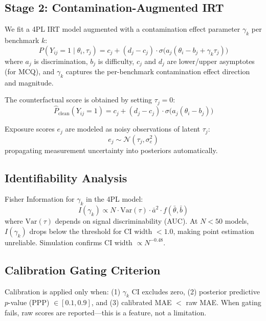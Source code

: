 \documentclass[11pt,a4paper]{article}
\begin{document}
\subsection{Stage 2: Contamination-Augmented IRT}

We fit a 4PL IRT model augmented with a contamination effect parameter $\gamma_k$ per benchmark $k$:
\begin{equation}
P(Y_{ij} = 1 \mid \theta_i, \tau_j) = c_j + (d_j - c_j) \cdot \sigma\bigl(a_j(\theta_i - b_j + \gamma_k \tau_j)\bigr)
\end{equation}
where $a_j$ is discrimination, $b_j$ is difficulty, $c_j$ and $d_j$ are lower/upper asymptotes (for MCQ), and $\gamma_k$ captures the per-benchmark contamination effect direction and magnitude.

The counterfactual score is obtained by setting $\tau_j = 0$:
\begin{equation}
\hat{P}_{\text{clean}}(Y_{ij}=1) = c_j + (d_j - c_j) \cdot \sigma\bigl(a_j(\theta_i - b_j)\bigr)
\end{equation}

Exposure scores $e_j$ are modeled as noisy observations of latent $\tau_j$:
\begin{equation}
e_j \sim \mathcal{N}(\tau_j, \sigma_e^2)
\end{equation}
propagating measurement uncertainty into posteriors automatically.

\subsection{Identifiability Analysis}

Fisher Information for $\gamma_k$ in the 4PL model:
\begin{equation}
I(\gamma_k) \propto N \cdot \text{Var}(\tau) \cdot \bar{a}^2 \cdot f(\bar{\theta}, \bar{b})
\end{equation}
where $\text{Var}(\tau)$ depends on signal discriminability (AUC). At $N < 50$ models, $I(\gamma_k)$ drops below the threshold for CI width $< 1.0$, making point estimation unreliable. Simulation confirms CI width $\propto N^{-0.48}$.

\subsection{Calibration Gating Criterion}

Calibration is applied only when: (1) $\gamma_k$ CI excludes zero, (2) posterior predictive $p$-value (PPP) $\in [0.1, 0.9]$, and (3) calibrated MAE $<$ raw MAE. When gating fails, raw scores are reported---this is a feature, not a limitation.
\end{document}
